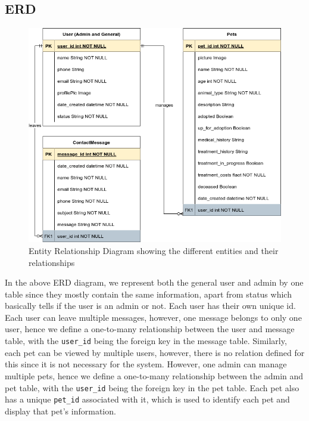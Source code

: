 \subsection{ERD}
\begin{figure}[H]
    \centering
    \includegraphics[width=\textwidth]{images/erd.png}
    \caption{Entity Relationship Diagram showing the different entities and their relationships}
\end{figure}
In the above ERD diagram, we represent both the general user and admin by one table since they mostly contain the same information, apart from status which basically tells if the user is an admin or not. Each user has their own unique id. Each user can leave multiple messages, however, one message belongs to only one user, hence we define a one-to-many relationship between the user and message table, with the \verb|user_id| being the foreign key in the message table. Similarly, each pet can be viewed by multiple users, however, there is no relation defined for this since it is not necessary for the system. However, one admin can manage multiple pets, hence we define a one-to-many relationship between the admin and pet table, with the \verb|user_id| being the foreign key in the pet table. Each pet also has a unique \verb|pet_id| associated with it, which is used to identify each pet and display that pet's information. 

\newpage

